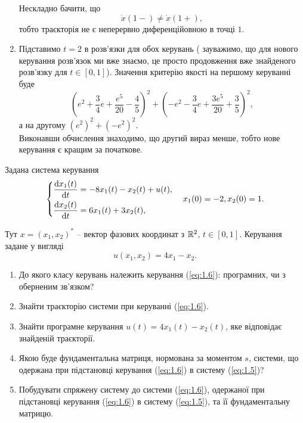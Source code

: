 \begin{solution}
\begin{enumerate}
		Нескладно бачити, що 
		\[ \dot x (1-) \ne \dot x (1+), \]
		тобто траєкторія не є неперервно диференційовною в точці $1$.
		
		\item 
		Підставимо $t=2$ в розв'язки для обох керувань (%
		зауважимо, що для нового керування розв'язок ми вже знаємо, це просто продовження вже знайденого розв'язку для $t \in [0, 1]$). Значення критерію якості на першому керуванні буде
		\[ \left(e^2 + \dfrac34e + \dfrac{e^5}{20} - \dfrac45\right)^2 + \left(-e^2 - \dfrac34e + \dfrac{3e^5}{20} + \dfrac35\right)^2, \]
		а на другому $(e^2)^2 + (-e^2)^2$. \\

	    Виконавши обчислення знаходимо, що другий вираз менше, тобто нове керування є кращим за початкове.
	\end{enumerate}
\end{solution}

\begin{problem}
	Задана система керування 
	\begin{equation}
		\label{eq:1.5}
		\left\{
			\begin{aligned}
				\dfrac{\mathop{}\!\mathrm{d} x_1(t)}{\mathop{}\!\mathrm{d} t} &= -8x_1(t)  -x_2(t) + u(t),\\
				\dfrac{\mathop{}\!\mathrm{d} x_2(t)}{\mathop{}\!\mathrm{d} t} &= 6x_1(t) + 3x_2(t),
			\end{aligned}
		\right.
		\quad
		x_1(0) = -2, x_2(0) = 1.
	\end{equation}

	Тут $ x =(x_1, x_2)^*$ -- вектор фазових координат з $\mathbb{R}^2$, $t \in [0, 1]$. Керування задане у вигляді
	\begin{equation}
		\label{eq:1.6}
		u(x_1, x_2) = 4x_1 - x_2.
	\end{equation}

	\begin{enumerate}
		\item До якого класу керувань належить керування (\ref{eq:1.6}): програмних, чи з оберненим зв'язком?
		\item Знайти траєкторію системи при керуванні (\ref{eq:1.6}).
		\item Знайти програмне керування $u(t) = 4x_1(t) - x_2(t)$, яке відповідає знайденій траєкторії.
		\item Якою буде фундаментальна матриця, нормована за моментом $s$, системи, що одержана при підстановці керування (\ref{eq:1.6}) в систему (\ref{eq:1.5})?
		\item Побудувати спряжену систему до системи (\ref{eq:1.6}), одержаної при підстановці керування (\ref{eq:1.6}) в систему (\ref{eq:1.5}), та її фундаментальну матрицю.
	\end{enumerate}
\end{problem}

